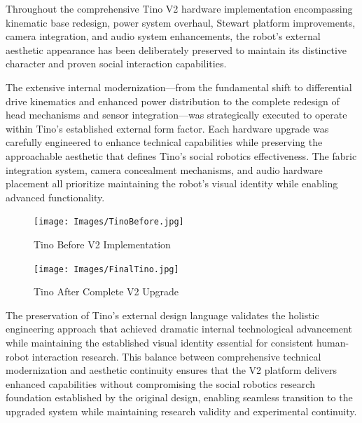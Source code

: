 Throughout the comprehensive Tino V2 hardware implementation encompassing kinematic base redesign, power system overhaul, Stewart platform improvements, camera integration, and audio system enhancements, the robot's external aesthetic appearance has been deliberately preserved to maintain its distinctive character and proven social interaction capabilities.

The extensive internal modernization—from the fundamental shift to differential drive kinematics and enhanced power distribution to the complete redesign of head mechanisms and sensor integration—was strategically executed to operate within Tino's established external form factor. Each hardware upgrade was carefully engineered to enhance technical capabilities while preserving the approachable aesthetic that defines Tino's social robotics effectiveness. The fabric integration system, camera concealment mechanisms, and audio hardware placement all prioritize maintaining the robot's visual identity while enabling advanced functionality.

\begin{figure}[H]
    \centering
    \begin{minipage}{0.45\textwidth}
        \centering
        \texttt{[image: Images/TinoBefore.jpg]}
        \caption{Tino Before V2 Implementation}
        \label{fig:tino_before_upgrade}
    \end{minipage}
    \hfill
    \begin{minipage}{0.45\textwidth}
        \centering
        \texttt{[image: Images/FinalTino.jpg]}
        \caption{Tino After Complete V2 Upgrade}
        \label{fig:tino_after_upgrade}
    \end{minipage}
\end{figure}

The preservation of Tino's external design language validates the holistic engineering approach that achieved dramatic internal technological advancement while maintaining the established visual identity essential for consistent human-robot interaction research. This balance between comprehensive technical modernization and aesthetic continuity ensures that the V2 platform delivers enhanced capabilities without compromising the social robotics research foundation established by the original design, enabling seamless transition to the upgraded system while maintaining research validity and experimental continuity.

